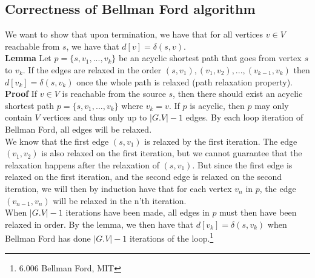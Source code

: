 \documentclass[11pt]{article}
\begin{document}
\subsection{Correctness of Bellman Ford algorithm}
We want to show that upon termination, we have that for all vertices $v \in V$ reachable from $s$, we have that $d[v] = \delta(s,v)$.\\

\noindent \textbf{Lemma}
Let $p=\{s, v_1, ..., v_{k}\}$ be an acyclic shortest path that goes from vertex $s$ to $v_k$. If the edges are relaxed in the order $(s, v_1), (v_1, v_2), ..., (v_{k-1}, v_k)$ then $d[v_k]=\delta(s,v_k)$ once the whole path is relaxed (path relaxation property).\\

\noindent \textbf{Proof}
If $v \in V$ is reachable from the source $s$, then there should exist an acyclic shortest path $p=\{s, v_1, ..., v_k\}$ where $v_k = v$. If $p$ is acyclic, then $p$ may only contain $V$ vertices and thus only up to $|G.V| - 1$ edges. By each loop iteration of Bellman Ford, all edges will be relaxed.\\ 

\noindent We know that the first edge $(s, v_1)$ is relaxed by the first iteration. The edge $(v_1, v_2)$ is also relaxed on the first iteration, but we cannot guarantee that the relaxation happens after the relaxation of $(s,v_1)$. But since the first edge is relaxed on the first iteration, and the second edge is relaxed on the second iteration, we will then by induction have that for each vertex $v_n$ in $p$, the edge $(v_{n-1}, v_n)$ will be relaxed in the n'th iteration.\\

\noindent When $|G.V|-1$ iterations have been made, all edges in $p$ must then have been relaxed in order. By the lemma, we then have that $d[v_k]=\delta(s,v_k)$ when Bellman Ford has done $|G.V|-1$ iterations of the loop.\footnote{6.006 Bellman Ford, MIT}
\end{document}
